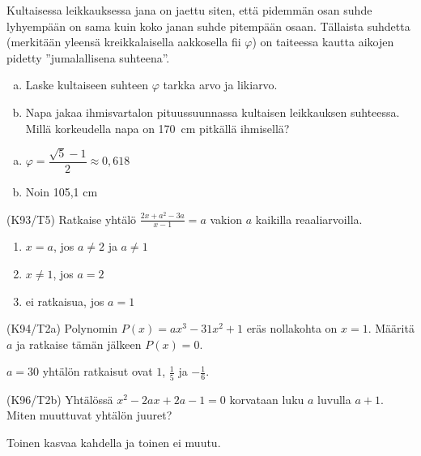 \begin{tehtava}
    Kultaisessa leikkauksessa jana on jaettu siten, että pidemmän osan suhde lyhyempään on sama kuin koko janan suhde pitempään osaan. Tällaista suhdetta (merkitään yleensä kreikkalaisella aakkosella fii $\varphi$) on taiteessa kautta aikojen pidetty ''jumalallisena suhteena''.
		\begin{enumerate}[a)]
            \item Laske kultaiseen suhteen $\varphi$ tarkka arvo ja likiarvo.
            \item Napa jakaa ihmisvartalon pituussuunnassa kultaisen leikkauksen suhteessa. Millä korkeudella napa on 170~cm pitkällä ihmisellä?
        \end{enumerate}
    \begin{vastaus}
        \begin{enumerate}[a)]
            \item $ \varphi = \dfrac{\sqrt{5}-1}{2} \approx 0,618$
            \item Noin 105,1 cm
        \end{enumerate}
    \end{vastaus}
\end{tehtava}
\begin{tehtava}
(K93/T5) Ratkaise yhtälö 
        $\frac{2x+a^2-3a}{x-1}=a$ vakion $a$ kaikilla reaaliarvoilla.
\begin{vastaus}
        \begin{enumerate}
         \item{$x=a$, jos $a \neq 2$ ja $a \neq 1$} 
         \item{$x\neq 1$, jos $a=2$}
         \item{ei ratkaisua, jos $a=1$}
        \end{enumerate}
    \end{vastaus}
\end{tehtava}
\begin{tehtava}
(K94/T2a) Polynomin $P(x)=ax^3-31x^2+1$ eräs nollakohta on $x=1$. Määritä $a$ ja ratkaise tämän jälkeen $P(x)=0$.
\begin{vastaus}
      $a=30$ yhtälön ratkaisut ovat $1$, $\frac{1}{5}$ ja $-\frac{1}{6}$.
    \end{vastaus}
\end{tehtava}
\begin{tehtava}
(K96/T2b) Yhtälössä $x^2-2ax+2a-1=0$ korvataan luku $a$ luvulla $a+1$. Miten muuttuvat yhtälön juuret?
\begin{vastaus}
     Toinen kasvaa kahdella ja toinen ei muutu.
    \end{vastaus}
\end{tehtava}

